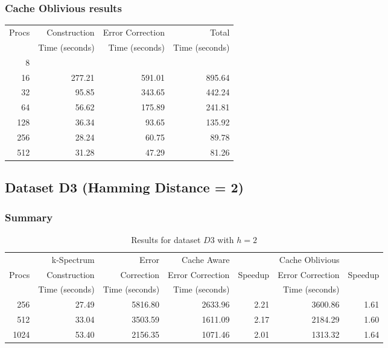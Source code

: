 \documentclass[integrals, nointegrals, article, 12pt, a4paper]{article}
\begin{document}
\subsubsection{Cache Oblivious results}
\label{sec-3-4-3}

\begin{center}
\begin{tabular}{rrrr}
\hline
Procs & Construction & Error Correction & Total\\
 & Time (seconds) & Time (seconds) & Time (seconds)\\
\hline
8 &  &  & \\
16 & 277.21 & 591.01 & 895.64\\
32 & 95.85 & 343.65 & 442.24\\
64 & 56.62 & 175.89 & 241.81\\
128 & 36.34 & 93.65 & 135.92\\
256 & 28.24 & 60.75 & 89.78\\
512 & 31.28 & 47.29 & 81.26\\
\hline
\end{tabular}
\end{center}

\subsection{Dataset D3 (Hamming Distance = 2)}
\label{sec-3-5}
\subsubsection{Summary}
\label{sec-3-5-1}
\begin{table}[htb]
\caption{\label{tab:d3h2run}Results for dataset $D3$ with $h = 2$}
\centering
\begin{tabular}{rrrrrrr}
\hline
 & k-Spectrum & Error & Cache Aware &  & Cache Oblivious & \\
Procs & Construction & Correction & Error Correction & Speedup & Error Correction & Speedup\\
 & Time (seconds) & Time (seconds) & Time (seconds) &  & Time (seconds) & \\
\hline
256 & 27.49 & 5816.80 & 2633.96 & 2.21 & 3600.86 & 1.61\\
512 & 33.04 & 3503.59 & 1611.09 & 2.17 & 2184.29 & 1.60\\
1024 & 53.40 & 2156.35 & 1071.46 & 2.01 & 1313.32 & 1.64\\
\hline
\end{tabular}
\end{table}
\end{document}
